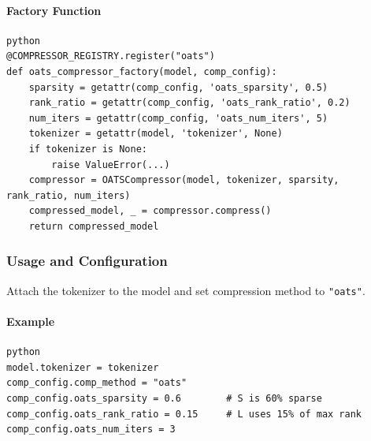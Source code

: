 \paragraph{Factory Function}

\vspace{0.5em}
\begin{mdframed}[backgroundcolor=codebg, linecolor=codeframe, linewidth=1pt, roundcorner=4pt, innerleftmargin=2pt, innerrightmargin=5pt, innertopmargin=5pt, innerbottommargin=5pt]
\begin{lstlisting}
python
@COMPRESSOR_REGISTRY.register("oats")
def oats_compressor_factory(model, comp_config):
    sparsity = getattr(comp_config, 'oats_sparsity', 0.5)
    rank_ratio = getattr(comp_config, 'oats_rank_ratio', 0.2)
    num_iters = getattr(comp_config, 'oats_num_iters', 5)
    tokenizer = getattr(model, 'tokenizer', None)
    if tokenizer is None:
        raise ValueError(...)
    compressor = OATSCompressor(model, tokenizer, sparsity, rank_ratio, num_iters)
    compressed_model, _ = compressor.compress()
    return compressed_model
\end{lstlisting}
\end{mdframed}
\vspace{0.5em}


\subsubsection*{Usage and Configuration}

Attach the tokenizer to the model and set compression method to \texttt{"oats"}.

\paragraph{Example}

\vspace{0.5em}
\begin{mdframed}[backgroundcolor=codebg, linecolor=codeframe, linewidth=1pt, roundcorner=4pt, innerleftmargin=2pt, innerrightmargin=5pt, innertopmargin=5pt, innerbottommargin=5pt]
\begin{lstlisting}
python
model.tokenizer = tokenizer
comp_config.comp_method = "oats"
comp_config.oats_sparsity = 0.6        # S is 60% sparse
comp_config.oats_rank_ratio = 0.15     # L uses 15% of max rank
comp_config.oats_num_iters = 3
\end{lstlisting}
\end{mdframed}
\vspace{0.5em}


